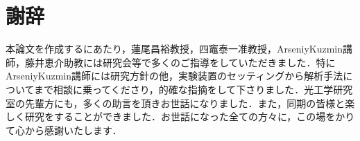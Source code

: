 \chapter*{謝辞}

本論文を作成するにあたり，蓮尾昌裕教授，四竈泰一准教授，ArseniyKuzmin講師，藤井恵介助教には研究会等で多くのご指導をしていただきました．特にArseniyKuzmin講師には研究方針の他，実験装置のセッティングから解析手法についてまで相談に乗ってくださり，的確な指摘をして下さりました．光工学研究室の先輩方にも，多くの助言を頂きお世話になりました．また，同期の皆様と楽しく研究をすることができました．お世話になった全ての方々に，この場をかりて心から感謝いたします．
